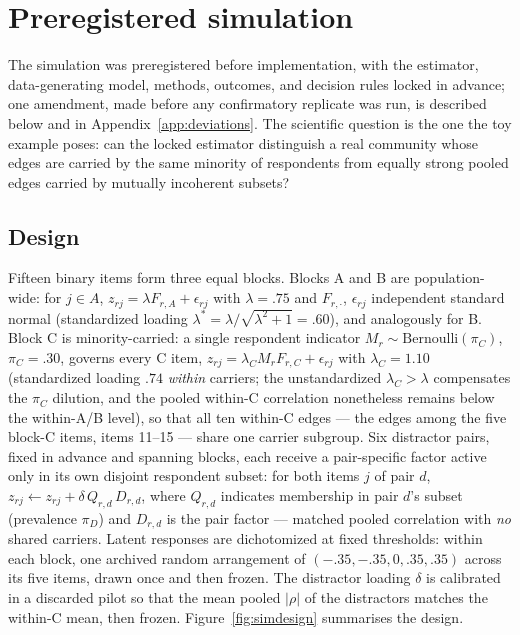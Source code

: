 \documentclass[11pt]{article}
\begin{document}
\FloatBarrier  %

\section{Preregistered simulation}\label{sec:sim}

The simulation was preregistered before implementation, with the estimator,
data-generating model, methods, outcomes, and decision rules locked in
advance; one amendment, made before any confirmatory replicate was run, is
described below and in Appendix~\ref{app:deviations}. The scientific
question is the one the toy example poses: can the locked estimator
distinguish a real community whose edges are carried by the same minority of
respondents from equally strong pooled edges carried by mutually incoherent
subsets?

\subsection{Design}
Fifteen binary items form three equal blocks. Blocks A and B are
population-wide: for $j\in A$, $z_{rj}=\lambda F_{r,A}+\epsilon_{rj}$ with
$\lambda=.75$ and $F_{r,\cdot}$, $\epsilon_{rj}$ independent standard
normal (standardized loading
$\lambda^{*}=\lambda/\sqrt{\lambda^2+1}=.60$), and analogously for B. Block
C is minority-carried: a single
respondent indicator $M_r\sim\mathrm{Bernoulli}(\pi_C)$, $\pi_C=.30$,
governs every C item, $z_{rj}=\lambda_C M_r F_{r,C}+\epsilon_{rj}$ with
$\lambda_C=1.10$ (standardized loading $.74$ \emph{within} carriers; the
unstandardized $\lambda_C>\lambda$ compensates the $\pi_C$ dilution, and the
pooled within-C correlation nonetheless remains below the within-A/B level),
so that all ten within-C edges --- the edges among the five block-C items,
items 11--15 --- share one carrier subgroup.
Six distractor pairs, fixed in advance and spanning blocks, each receive a
pair-specific factor active only in its own disjoint respondent subset:
for both items $j$ of pair $d$,
$z_{rj}\leftarrow z_{rj}+\delta\,Q_{r,d}\,D_{r,d}$, where $Q_{r,d}$
indicates membership in pair $d$'s subset (prevalence $\pi_D$) and
$D_{r,d}$ is the pair factor --- matched pooled correlation with \emph{no}
shared carriers. Latent responses
are dichotomized at fixed thresholds: within each block, one archived
random arrangement of $(-.35,-.35,0,.35,.35)$ across its five items,
drawn once and then frozen. The distractor loading
$\delta$ is calibrated in a discarded pilot so that the mean
pooled $|\rho|$ of the distractors matches the within-C mean, then frozen.
Figure~\ref{fig:simdesign} summarises the design.
\end{document}
